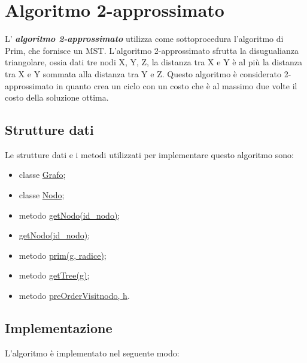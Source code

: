 \section{Algoritmo 2-approssimato}
\label{AlgoritmoApprossimato}

L' \textbf{\textit{algoritmo 2-approssimato}} utilizza come sottoprocedura l'algoritmo di Prim, che fornisce un MST.
L'algoritmo 2-approssimato sfrutta la disugualianza triangolare, ossia dati tre nodi X, Y, Z, la distanza tra X e Y è al più la distanza tra X e Y sommata alla distanza tra Y e Z.  
Questo algoritmo è considerato 2-approssimato in quanto crea un ciclo con un costo che è al massimo due volte il costo della soluzione ottima.

\subsection{Strutture dati}
\label{struttureDati3}

Le strutture dati e i metodi utilizzati per implementare questo algoritmo sono:

\begin{itemize}
    \item classe \hyperlink{subsection.2.1}{Grafo};
    \item classe \hyperlink{subsection.2.2}{Nodo};
    \item metodo \hyperlink{getNodo}{getNodo(id\_nodo)};
    \item \hyperlink{getNodo}{getNodo(id\_nodo)};
    \item metodo \hyperlink{prim}{prim(g, radice)};
    \item metodo \hyperlink{getTree}{getTree(g)};
    \item metodo \hyperlink{preOrderVisit}{preOrderVisit{nodo, h}}.
\end{itemize}


\subsection{Implementazione}
\label{implementazione3}

L'algoritmo è implementato nel seguente modo:

